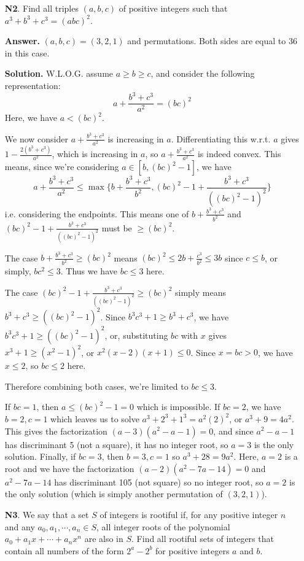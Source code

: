 \documentclass[11pt,a4paper]{article}
\begin{document}
\begin{enumerate}
	\item[\textbf{N2}.] Find all triples $(a, b, c)$ of positive integers such that $a^3 + b^3 + c^3 = (abc)^2$.
	
	\textbf{Answer.} $(a, b, c)=(3, 2, 1)$ and permutations. Both sides are equal to 36 in this case. 
	
	\textbf{Solution.} W.L.O.G. assume $a\ge b\ge c$, and consider the following representation: 
	\[
	a+\frac{b^3+c^3}{a^2}=(bc)^2
	\]
	Here, we have $a< (bc)^2$. 
	
	We now consider $a+\frac{b^3+c^3}{a^2}$ is increasing in $a$. Differentiating this w.r.t. $a$ gives $1-\frac{2(b^3+c^3)}{a^2}$, which is increasing in $a$, so $a+\frac{b^3+c^3}{a^2}$ is indeed convex. This means, since we're considering $a\in [b, (bc)^2-1]$, we have 
	\[
	a+\frac{b^3+c^3}{a^2}\le \max\{b+\frac{b^3+c^3}{b^2}, (bc)^2-1+\frac{b^3+c^3}{((bc)^2-1)^2}\}
	\]
	i.e. considering the endpoints. This means one of $b+\frac{b^3+c^3}{b^2}$ and $(bc)^2-1+\frac{b^3+c^3}{((bc)^2-1)^2}$ must be $\ge (bc)^2$. 
	
	The case $b+\frac{b^3+c^3}{b^2}\ge (bc)^2$ means $(bc)^2\le 2b+\frac{c^3}{b^2}\le 3b$ since $c\le b$, or simply, $bc^2\le 3$. Thus we have $bc\le 3$ here. 
	
	The case $(bc)^2-1+\frac{b^3+c^3}{((bc)^2-1)^2}\ge (bc)^2$ simply means $b^3+c^3\ge ((bc)^2-1)^2$. Since $b^3c^3+1\ge b^3+c^3$, we have $b^3c^3+1\ge ((bc)^2-1)^2$, or, substituting $bc$ with $x$ gives $x^3+1\ge (x^2-1)^2$, or $x^2(x-2)(x+1)\le 0$. Since $x=bc>0$, we have $x\le 2$, so $bc\le 2$ here. 
	
	Therefore combining both cases, we're limited to $bc\le 3$. 
	
	If $bc=1$, then $a\le (bc)^2-1=0$ which is impossible. If $bc=2$, we have $b=2, c=1$ which leaves us to solve $a^3+2^3+1^3=a^2(2)^2$, or $a^3+9=4a^2$. This gives the factorization $(a-3)(a^2-a-1)=0$, and since $a^2-a-1$ has discriminant 5 (not a square), it has no integer root, so $a=3$ is the only solution. Finally, if $bc=3$, then $b=3, c=1$ so $a^3+28=9a^2$. Here, $a=2$ is a root and we have the factorization $(a-2)(a^2-7a-14)=0$ and $a^2-7a-14$ has discriminant 105 (not square) so no integer root, so $a=2$ is the only solution (which is simply another permutation of $(3, 2, 1)$). 
	
	\item[\textbf{N3}.] We say that a set $S$ of integers is rootiful if, for any positive integer $n$ and any $a_0, a_1, \cdots, a_n \in S$, all integer roots of the polynomial $a_0+a_1x+\cdots+a_nx^n$ are also in $S$. Find all rootiful sets of integers that contain all numbers of the form $2^a - 2^b$ for positive integers $a$ and $b$.
	

\end{enumerate}
\end{document}
